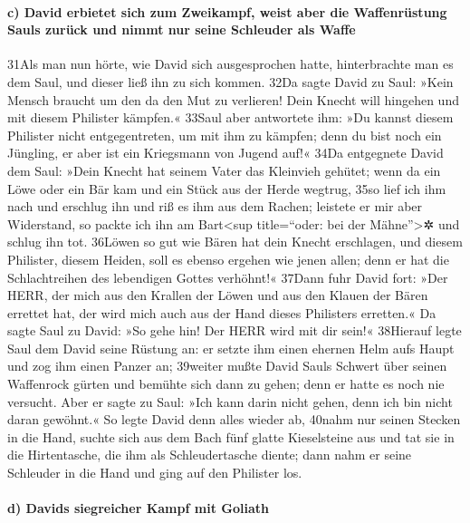\hypertarget{c-david-erbietet-sich-zum-zweikampf-weist-aber-die-waffenruxfcstung-sauls-zuruxfcck-und-nimmt-nur-seine-schleuder-als-waffe}{%
\paragraph{c) David erbietet sich zum Zweikampf, weist aber die
Waffenrüstung Sauls zurück und nimmt nur seine Schleuder als
Waffe}\label{c-david-erbietet-sich-zum-zweikampf-weist-aber-die-waffenruxfcstung-sauls-zuruxfcck-und-nimmt-nur-seine-schleuder-als-waffe}}

31Als man nun hörte, wie David sich ausgesprochen hatte, hinterbrachte
man es dem Saul, und dieser ließ ihn zu sich kommen. 32Da sagte David zu
Saul: »Kein Mensch braucht um den da den Mut zu verlieren! Dein Knecht
will hingehen und mit diesem Philister kämpfen.« 33Saul aber antwortete
ihm: »Du kannst diesem Philister nicht entgegentreten, um mit ihm zu
kämpfen; denn du bist noch ein Jüngling, er aber ist ein Kriegsmann von
Jugend auf!« 34Da entgegnete David dem Saul: »Dein Knecht hat seinem
Vater das Kleinvieh gehütet; wenn da ein Löwe oder ein Bär kam und ein
Stück aus der Herde wegtrug, 35so lief ich ihm nach und erschlug ihn und
riß es ihm aus dem Rachen; leistete er mir aber Widerstand, so packte
ich ihn am Bart\textless sup title=``oder: bei der Mähne''\textgreater✲
und schlug ihn tot. 36Löwen so gut wie Bären hat dein Knecht erschlagen,
und diesem Philister, diesem Heiden, soll es ebenso ergehen wie jenen
allen; denn er hat die Schlachtreihen des lebendigen Gottes verhöhnt!«
37Dann fuhr David fort: »Der HERR, der mich aus den Krallen der Löwen
und aus den Klauen der Bären errettet hat, der wird mich auch aus der
Hand dieses Philisters erretten.« Da sagte Saul zu David: »So gehe hin!
Der HERR wird mit dir sein!« 38Hierauf legte Saul dem David seine
Rüstung an: er setzte ihm einen ehernen Helm aufs Haupt und zog ihm
einen Panzer an; 39weiter mußte David Sauls Schwert über seinen
Waffenrock gürten und bemühte sich dann zu gehen; denn er hatte es noch
nie versucht. Aber er sagte zu Saul: »Ich kann darin nicht gehen, denn
ich bin nicht daran gewöhnt.« So legte David denn alles wieder ab,
40nahm nur seinen Stecken in die Hand, suchte sich aus dem Bach fünf
glatte Kieselsteine aus und tat sie in die Hirtentasche, die ihm als
Schleudertasche diente; dann nahm er seine Schleuder in die Hand und
ging auf den Philister los.

\hypertarget{d-davids-siegreicher-kampf-mit-goliath}{%
\paragraph{d) Davids siegreicher Kampf mit
Goliath}\label{d-davids-siegreicher-kampf-mit-goliath}}


